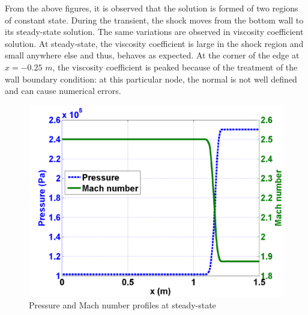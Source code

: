 From the above figures, it is observed that the solution is formed of two regions of constant state. During the transient, the shock moves from the bottom wall to its steady-state solution. The same variations are observed in viscosity coefficient solution. At steady-state, the viscosity coefficient is large in the shock region and small anywhere else and thus, behaves as expected. At the corner of the edge at $x=-0.25$ $m$, the viscosity coefficient is peaked because of the treatment of the wall boundary condition: at this particular node, the normal is not well defined and can cause numerical errors. 
        \begin{figure}[H]%
                \centering
                \includegraphics[scale=.50]{figures/mach_number_pressure.png}
                \caption{Pressure and Mach number profiles at steady-state}
                \label{fig:2d_corner_isomach}
        \end{figure}        
